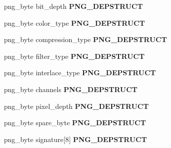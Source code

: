 \begin{DoxyCompactItemize}
\item 
\hypertarget{structpng__info__struct_ad2693c340c6b1c5132f99ed373661eb5}{png\-\_\-byte bit\-\_\-depth {\bfseries P\-N\-G\-\_\-\-D\-E\-P\-S\-T\-R\-U\-C\-T}}\label{structpng__info__struct_ad2693c340c6b1c5132f99ed373661eb5}

\item 
\hypertarget{structpng__info__struct_a2bf336786507e0dc8fe92b8f6d89eb0a}{png\-\_\-byte color\-\_\-type {\bfseries P\-N\-G\-\_\-\-D\-E\-P\-S\-T\-R\-U\-C\-T}}\label{structpng__info__struct_a2bf336786507e0dc8fe92b8f6d89eb0a}

\item 
\hypertarget{structpng__info__struct_ac27c6ac9aaa7e13fc36703fd417dc38e}{png\-\_\-byte compression\-\_\-type {\bfseries P\-N\-G\-\_\-\-D\-E\-P\-S\-T\-R\-U\-C\-T}}\label{structpng__info__struct_ac27c6ac9aaa7e13fc36703fd417dc38e}

\item 
\hypertarget{structpng__info__struct_ae5d1ea545c5e7d57fdd0efbea4aa2a73}{png\-\_\-byte filter\-\_\-type {\bfseries P\-N\-G\-\_\-\-D\-E\-P\-S\-T\-R\-U\-C\-T}}\label{structpng__info__struct_ae5d1ea545c5e7d57fdd0efbea4aa2a73}

\item 
\hypertarget{structpng__info__struct_afeca56088caac7983a0c84947f180804}{png\-\_\-byte interlace\-\_\-type {\bfseries P\-N\-G\-\_\-\-D\-E\-P\-S\-T\-R\-U\-C\-T}}\label{structpng__info__struct_afeca56088caac7983a0c84947f180804}

\item 
\hypertarget{structpng__info__struct_a7e0069f4f90c68689ae3f998acb456ec}{png\-\_\-byte channels {\bfseries P\-N\-G\-\_\-\-D\-E\-P\-S\-T\-R\-U\-C\-T}}\label{structpng__info__struct_a7e0069f4f90c68689ae3f998acb456ec}

\item 
\hypertarget{structpng__info__struct_a3f7b09799a025d56f9054b762a03dbfe}{png\-\_\-byte pixel\-\_\-depth {\bfseries P\-N\-G\-\_\-\-D\-E\-P\-S\-T\-R\-U\-C\-T}}\label{structpng__info__struct_a3f7b09799a025d56f9054b762a03dbfe}

\item 
\hypertarget{structpng__info__struct_a4fc501f431c375aab961c948a76fcb50}{png\-\_\-byte spare\-\_\-byte {\bfseries P\-N\-G\-\_\-\-D\-E\-P\-S\-T\-R\-U\-C\-T}}\label{structpng__info__struct_a4fc501f431c375aab961c948a76fcb50}

\item 
\hypertarget{structpng__info__struct_a2edf6b88b6d0e4af4f4f175bf45fa5b9}{png\-\_\-byte signature\mbox{[}8\mbox{]} {\bfseries P\-N\-G\-\_\-\-D\-E\-P\-S\-T\-R\-U\-C\-T}}\label{structpng__info__struct_a2edf6b88b6d0e4af4f4f175bf45fa5b9}


\end{DoxyCompactItemize}
